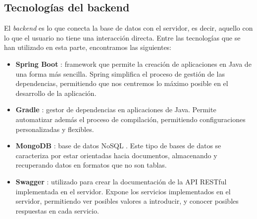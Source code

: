 \subsection{Tecnologías del backend}

El {\it backend} es lo que conecta la base de datos con el servidor, es decir, aquello con lo que el usuario no tiene una interacción directa. Entre las tecnologías que se han utilizado en esta parte, encontramos las siguientes:

\begin{itemize}
    \item {\bf Spring Boot} \cite{spring}: framework que permite la creación de aplicaciones en Java de una forma más sencilla. Spring simplifica el proceso de gestión de las dependencias, permitiendo que nos centremos lo máximo posible en el desarrollo de la aplicación.
    \item {\bf Gradle} \cite{gradle}: gestor de dependencias en aplicaciones de Java. Permite automatizar además el proceso de compilación, permitiendo configuraciones personalizadas y flexibles.
    \item {\bf MongoDB} \cite{mongodb}: base de datos NoSQL \cite{nosql}. Este tipo de bases de datos se caracteriza por estar orientadas hacia documentos, almacenando y recuperando datos en formatos que no son tablas.
    \item {\bf Swagger} \cite{swagger}: utilizado para crear la documentación de la API RESTful implementada en el servidor. Expone los servicios implementados en el servidor, permitiendo ver posibles valores a introducir, y conocer posibles respuestas en cada servicio.
\end{itemize}